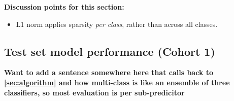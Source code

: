\documentclass{article}
\begin{document}

\textbf{Discussion points for this section:}
\begin{itemize}
    \item L1 norm applies sparsity \textit{per class}, rather than across all classes.
\end{itemize}

\subsection{Test set model performance (Cohort 1)} \label{sec:cohort1-performance}
\textbf{Want to add a sentence somewhere here that calls back to \ref{sec:algorithm} and how multi-class is like an ensemble of three classifiers, so most evaluation is per sub-predicitor}
\end{document}
